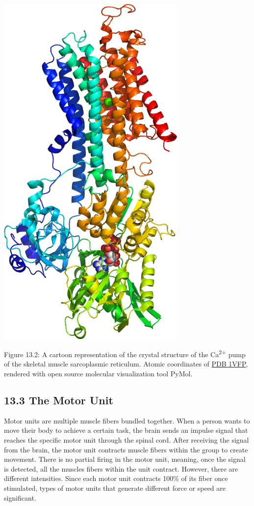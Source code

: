 \protect\hypertarget{fig:sercastructure}{}{}
\includegraphics[width=0.7\textwidth,height=\textheight]{figures/motor/Ca_pump.png}

Figure 13.2: A cartoon representation of the crystal structure of the
Ca\textsuperscript{2+} pump of the skeletal muscle sarcoplasmic
reticulum. Atomic coordinates of
\href{https://www.rcsb.org/structure/1VFP}{PDB 1VFP}, rendered with open
source molecular visualization tool PyMol.

\hypertarget{the-motor-unit}{%
\subsection{\texorpdfstring{{13.3} The Motor
Unit}{13.3 The Motor Unit}}\label{the-motor-unit}}

Motor units are multiple muscle fibers bundled together. When a person
wants to move their body to achieve a certain task, the brain sends an
impulse signal that reaches the specific motor unit through the spinal
cord. After receiving the signal from the brain, the motor unit
contracts muscle fibers within the group to create movement. There is no
partial firing in the motor unit, meaning, once the signal is detected,
all the muscles fibers within the unit contract. However, there are
different intensities. Since each motor unit contracts 100\% of its
fiber once stimulated, types of motor units that generate different
force or speed are significant.

